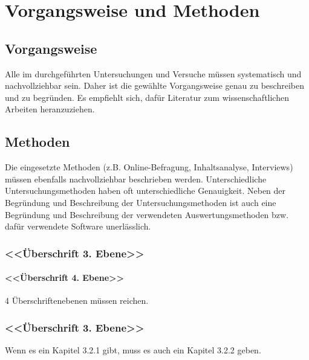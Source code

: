\chapter{Vorgangsweise und Methoden}
\section{Vorgangsweise}
Alle im durchgeführten Untersuchungen und Versuche müssen systematisch und nachvollziehbar sein. Daher ist die gewählte Vorgangsweise genau zu beschreiben und zu begründen. Es empfiehlt sich, dafür Literatur zum wissenschaftlichen Arbeiten heranzuziehen.
\section{Methoden}
Die eingesetzte Methoden (z.B. Online-Befragung, Inhaltsanalyse, Interviews) müssen ebenfalls nachvollziehbar beschrieben werden. 
Unterschiedliche Untersuchungsmethoden haben oft unterschiedliche Genauigkeit.
Neben der Begründung und Beschreibung der Untersuchungsmethoden ist auch eine Begründung und Beschreibung der verwendeten Auswertungsmethoden bzw. dafür verwendete Software unerlässlich.
\subsection{\textless\textless Überschrift 3. Ebene\textgreater\textgreater}
\subsubsection{\textless\textless Überschrift 4. Ebene\textgreater\textgreater}
4 Überschriftenebenen müssen reichen.
\subsection{\textless\textless Überschrift 3. Ebene\textgreater\textgreater}
Wenn es ein Kapitel 3.2.1 gibt, muss es auch ein Kapitel 3.2.2 geben.

